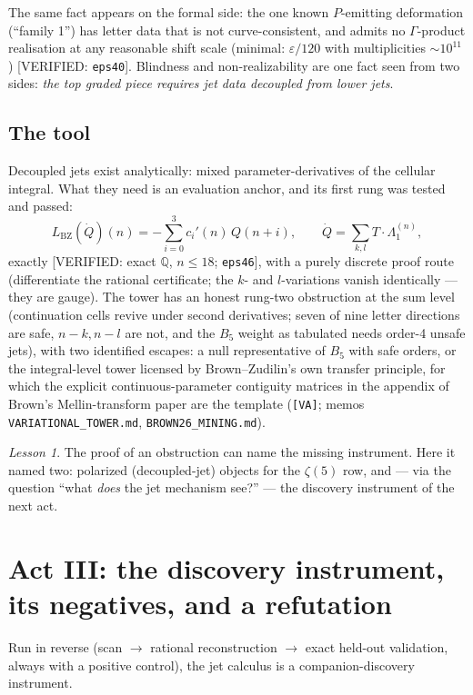 \documentclass[11pt,reqno]{amsart}
\theoremstyle{plain}
\theoremstyle{definition}
\theoremstyle{remark}
\newtheorem{lesson}[theorem]{Lesson}
\newcommand{\Q}{\mathbb{Q}}
\newcommand{\Lbz}{L_{\mathrm{BZ}}}
\newcommand{\VerifiedR}[1]{\textup{\textsf{[VERIFIED: #1]}}}
\newcommand{\VA}{\texttt{[VA]}}
\begin{document}
The same fact appears on the formal side: the one known
$P$-emitting deformation (``family 1'') has letter data that is not
curve-consistent, and admits no $\Gamma$-product realisation at any
reasonable shift scale (minimal: $\varepsilon/120$ with multiplicities
$\sim10^{11}$) \VerifiedR{\texttt{eps40}}. Blindness and
non-realizability are one fact seen from two sides: \emph{the top graded
piece requires jet data decoupled from lower jets}.

\subsection{The tool}
Decoupled jets exist analytically: mixed parameter-derivatives of the
cellular integral. What they need is an evaluation anchor, and its first
rung was tested and passed:
\[
\Lbz(\dot Q)(n)=-\sum_{i=0}^3c_i'(n)\,Q(n+i),
\qquad
\dot Q=\textstyle\sum_{k,l}T\cdot\Lambda_1^{(n)},
\]
exactly \VerifiedR{exact $\Q$, $n\le18$; \texttt{eps46}}, with a purely
discrete proof route (differentiate the rational certificate; the $k$-
and $l$-variations vanish identically --- they are gauge). The tower has
an honest rung-two obstruction at the sum level (continuation cells
revive under second derivatives; seven of nine letter directions are
safe, $n{-}k,n{-}l$ are not, and the $B_5$ weight as tabulated needs
order-4 unsafe jets), with two identified escapes: a null representative
of $B_5$ with safe orders, or the integral-level tower licensed by
Brown--Zudilin's own transfer principle, for which the explicit
continuous-parameter contiguity matrices in the appendix of Brown's
Mellin-transform paper are the template (\VA; memos
\texttt{VARIATIONAL\_TOWER.md}, \texttt{BROWN26\_MINING.md}).

\begin{lesson}
The proof of an obstruction can name the missing instrument. Here it
named two: polarized (decoupled-jet) objects for the $\zeta(5)$ row, and
--- via the question ``what \emph{does} the jet mechanism see?'' --- the
discovery instrument of the next act.
\end{lesson}

\section{Act III: the discovery instrument, its negatives, and a
refutation}\label{sec:instrument}

Run in reverse (scan $\to$ rational reconstruction $\to$ exact held-out
validation, always with a positive control), the jet calculus is a
companion-discovery instrument.
\end{document}
